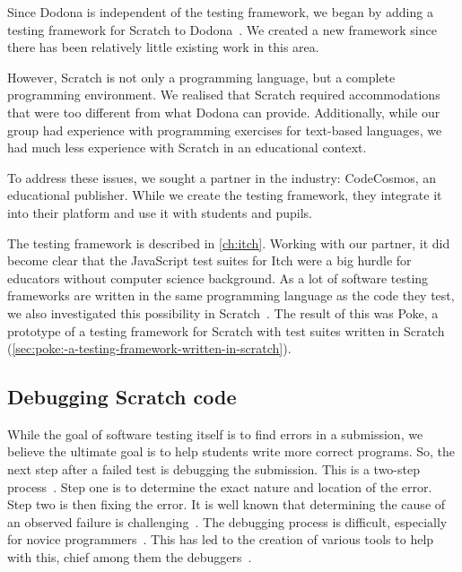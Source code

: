 \documentclass[./main]{subfiles}
\begin{document}
Since Dodona is independent of the testing framework, we began by adding a testing framework for Scratch to Dodona~\autocite{makItchEenEducatief2019}.
We created a new framework since there has been relatively little existing work in this area.

However, Scratch is not only a programming language, but a complete programming environment.
We realised that Scratch required accommodations that were too different from what Dodona can provide.
Additionally, while our group had experience with programming exercises for text-based languages, we had much less experience with Scratch in an educational context.

To address these issues, we sought a partner in the industry: CodeCosmos, an educational publisher.
While we create the testing framework, they integrate it into their platform and use it with students and pupils.

The testing framework is described in \cref{ch:itch}.
Working with our partner, it did become clear that the JavaScript test suites for Itch were a big hurdle for educators without computer science background.
As a lot of software testing frameworks are written in the same programming language as the code they test, we also investigated this possibility in Scratch~\autocite{voetenEenBlokgebaseerdTestframework2023}.
The result of this was Poke, a prototype of a testing framework for Scratch with test suites written in Scratch (\cref{sec:poke:-a-testing-framework-written-in-scratch}).

\subsection{Debugging Scratch code}\label{subsec:debugging-scratch-code}

While the goal of software testing itself is to find errors in a submission, we believe the ultimate goal is to help students write more correct programs.
So, the next step after a failed test is debugging the submission.
This is a two-step process~\autocite{myersArtSoftwareTesting2012}.
Step one is to determine the exact nature and location of the error.
Step two is then fixing the error.
It is well known that determining the cause of an observed failure is challenging~\autocite{ammannIntroductionSoftwareTesting2016}.
The debugging process is difficult, especially for novice programmers~\autocite{mccauleyDebuggingReviewLiterature2008}.
This has led to the creation of various tools to help with this, chief among them the debuggers~\autocite{rosenbergHowDebuggersWork1996}.
\end{document}
